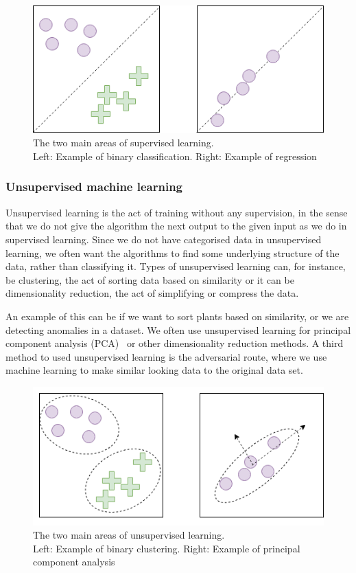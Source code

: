 \begin{figure}
    \centering
    \includegraphics[scale=0.5]{figures/class_vs_reg.png}
    \caption{The two main areas of supervised learning. \\ Left: Example of binary classification. Right: Example of regression} 
\end{figure}
  


\subsubsection{Unsupervised machine learning}
Unsupervised learning is the act of training without any supervision, in the sense that we do not give the algorithm the next output to the given input as we do in supervised learning. 
Since we do not have categorised data in unsupervised learning, we often want the algorithms to find some underlying structure of the data, rather than classifying it.
Types of unsupervised learning can, for instance, be clustering, the act of sorting data based on similarity or it can be dimensionality reduction, the act of simplifying or compress the data.

An example of this can be if we want to sort plants based on similarity, or we are detecting anomalies in a dataset. We often use unsupervised learning for principal component analysis (PCA)~\cite{doi:10.1080/14786440109462720} or other dimensionality reduction methods.
A third method to used unsupervised learning is the adversarial route, where we use machine learning to make similar looking data to the original data set. 
        
\begin{figure}
    \centering
    \includegraphics[scale=0.5]{figures/cluster_pca.png}
    \caption{The two main areas of unsupervised learning. \\ Left: Example of binary clustering. Right: Example of principal component analysis} 
\end{figure}

